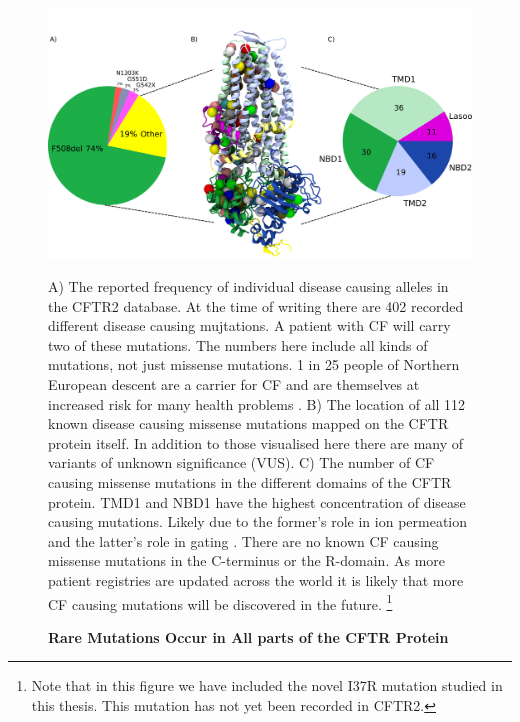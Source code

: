 \begin{figure}
	\begin{center}
	\includegraphics[width=\textwidth]{figures/alleles_pie_chart.pdf}
	\end{center}
	\label{CFTR_structure_domains}
	\captionsetup{singlelinecheck = false, justification=raggedright}
	\caption[Rare Mutations Occur in Across the CFTR Protein] {\textbf{Rare Mutations Occur in All parts of the CFTR Protein}}{A) The reported frequency of individual disease causing alleles in the CFTR2 database. At the time of writing there are 402 recorded different disease causing mujtations. A patient with CF will carry two of these mutations. The numbers here include all kinds of mutations, not just missense mutations. 1 in 25 people of Northern European descent are a carrier for CF and are themselves at increased risk for many health problems \cite{ioannou2014, miller2020}. B) The location of all 112 known disease causing missense mutations mapped on the CFTR protein itself. In addition to those visualised here there are many of variants of unknown significance (VUS). C) The number of CF causing missense mutations in the different domains of the CFTR protein. TMD1 and NBD1 have the highest concentration of disease causing mutations. Likely due to the former's role in ion permeation and the latter's role in gating \cite{cftr2}}. There are no known CF causing missense mutations in the C-terminus or the R-domain. As more patient registries are updated across the world it is likely that more CF causing mutations will be discovered in the future. \footnote{Note that in this figure we have included the novel I37R mutation studied in this thesis. This mutation has not yet been recorded in CFTR2.} 
\end{figure}


